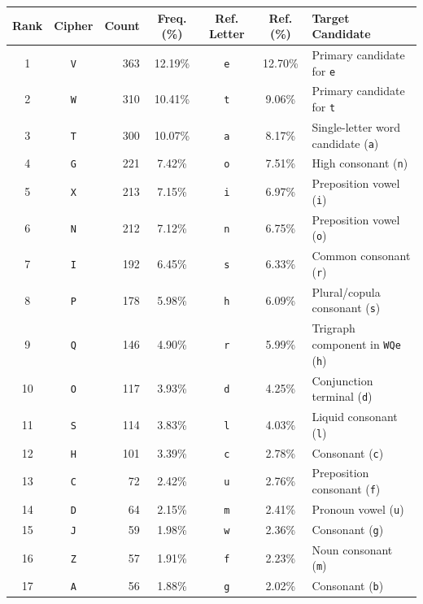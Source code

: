 \documentclass[11pt,a4paper]{article}
\begin{document}
\begin{table}[H]
\centering
\small
\setlength{\tabcolsep}{8pt}
\renewcommand{\arraystretch}{1.08}
\begin{tabular}{ccrcccl}
\toprule
\textbf{Rank} & \textbf{Cipher} & \textbf{Count} & \textbf{Freq. (\%)} & \textbf{Ref. Letter} & \textbf{Ref. (\%)} & \textbf{Target Candidate} \\
\midrule
1  & \texttt{V} & 363 & 12.19\% & \texttt{e} & 12.70\% & Primary candidate for \texttt{e} \\
2  & \texttt{W} & 310 & 10.41\% & \texttt{t} & 9.06\%  & Primary candidate for \texttt{t} \\
3  & \texttt{T} & 300 & 10.07\% & \texttt{a} & 8.17\%  & Single-letter word candidate (\texttt{a}) \\
4  & \texttt{G} & 221 &  7.42\% & \texttt{o} & 7.51\%  & High consonant (\texttt{n}) \\
5  & \texttt{X} & 213 &  7.15\% & \texttt{i} & 6.97\%  & Preposition vowel (\texttt{i}) \\
6  & \texttt{N} & 212 &  7.12\% & \texttt{n} & 6.75\%  & Preposition vowel (\texttt{o}) \\
7  & \texttt{I} & 192 &  6.45\% & \texttt{s} & 6.33\%  & Common consonant (\texttt{r}) \\
8  & \texttt{P} & 178 &  5.98\% & \texttt{h} & 6.09\%  & Plural/copula consonant (\texttt{s}) \\
9  & \texttt{Q} & 146 &  4.90\% & \texttt{r} & 5.99\%  & Trigraph component in \texttt{WQe} (\texttt{h}) \\
10 & \texttt{O} & 117 &  3.93\% & \texttt{d} & 4.25\%  & Conjunction terminal (\texttt{d}) \\
11 & \texttt{S} & 114 &  3.83\% & \texttt{l} & 4.03\%  & Liquid consonant (\texttt{l}) \\
12 & \texttt{H} & 101 &  3.39\% & \texttt{c} & 2.78\%  & Consonant (\texttt{c}) \\
13 & \texttt{C} &  72 &  2.42\% & \texttt{u} & 2.76\%  & Preposition consonant (\texttt{f}) \\
14 & \texttt{D} &  64 &  2.15\% & \texttt{m} & 2.41\%  & Pronoun vowel (\texttt{u}) \\
15 & \texttt{J} &  59 &  1.98\% & \texttt{w} & 2.36\%  & Consonant (\texttt{g}) \\
16 & \texttt{Z} &  57 &  1.91\% & \texttt{f} & 2.23\%  & Noun consonant (\texttt{m}) \\
17 & \texttt{A} &  56 &  1.88\% & \texttt{g} & 2.02\%  & Consonant (\texttt{b}) \\

\end{tabular}
\end{table}
\end{document}
